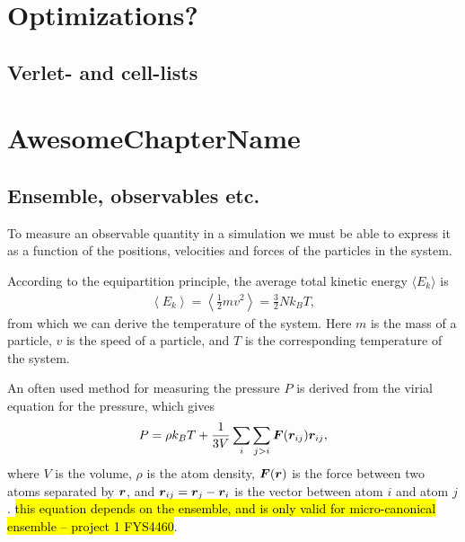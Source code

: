 \chapter{Optimizations?}

\section{Verlet- and cell-lists}
    













\chapter{AwesomeChapterName}

\section{Ensemble, observables etc.}


To measure an observable quantity in a simulation we must be able to express it as a function of the positions, velocities and forces of the particles in the system. 

According to the equipartition principle, the average total kinetic energy $\langle E_k \rangle$ is
\begin{align*}
    \left\langle E_k \right\rangle = \left\langle \frac{1}{2}mv^2 \right\rangle = \frac{3}{2}Nk_B T,
\end{align*}
from which we can derive the temperature of the system. Here $m$ is the mass of a particle, $v$ is the speed of a particle, and $T$ is the corresponding temperature of the system.

An often used method for measuring the pressure $P$ is derived from the virial equation for the pressure, which gives
\begin{align*}
    P = \rho k_B T + \frac{1}{3V}\sum_i \sum_{j>i} \boldsymbol{F}(\boldsymbol{r}_{ij}) \boldsymbol{r}_{ij},
\end{align*}
where $V$ is the volume, $\rho$ is the atom density, $\boldsymbol{F}(\boldsymbol{r})$ is the force between two atoms separated by $\boldsymbol{r}$, and $\boldsymbol{r}_{ij} = \boldsymbol{r}_j - \boldsymbol{r}_i$ is the vector between atom $i$ and atom $j$. \hl{this equation depends on the ensemble, and is only valid for micro-canonical ensemble -- project 1 FYS4460}.



